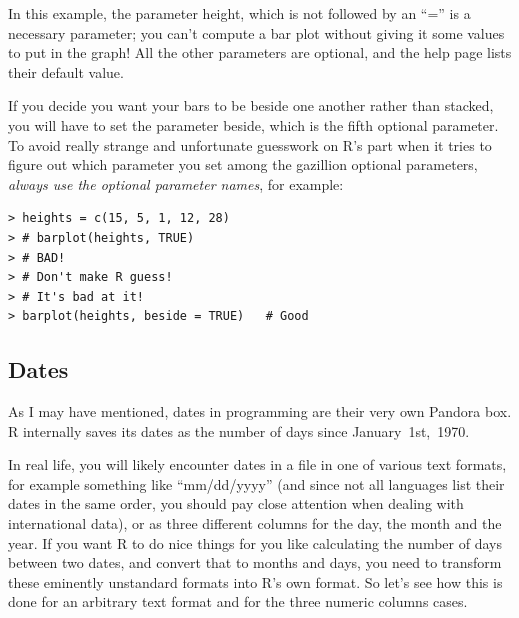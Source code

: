 \documentclass{report}
\newcommand{\code}[1]{\textsf{\ttfamily #1}}
\begin{document}
		In this example, the parameter \code{height}, which is not followed by an ``='' is a necessary parameter; you can't compute a bar plot without giving it some values to put in the graph! All the other parameters are optional, and the help page lists their default value.
	
		If you decide you want your bars to be beside one another rather than stacked, you will have to set the parameter \code{beside}, which is the fifth optional parameter. To avoid really strange and unfortunate guesswork on R's part when it tries to figure out which parameter you set among the gazillion optional parameters, \emph{always use the optional parameter names}, for example:
		\begin{verbatim}
> heights = c(15, 5, 1, 12, 28)
> # barplot(heights, TRUE) 
> # BAD! 
> # Don't make R guess! 
> # It's bad at it!
> barplot(heights, beside = TRUE)	# Good
		\end{verbatim}
		
		\subsection{Dates}
		As I may have mentioned, dates in programming are their very own Pandora box. R internally saves its dates as the number of days since January~1st,~1970.
		
		In real life, you will likely encounter dates in a file in one of various text formats, for example something like ``mm/dd/yyyy'' (and since not all languages list their dates in the same order, you should pay close attention when dealing with international data), or as three different columns for the day, the month and the year. If you want R to do nice things for you like calculating the number of days between two dates, and convert that to months and days, you need to transform these eminently unstandard formats into R's own format. So let's see how this is done for an arbitrary text format and for the three numeric columns cases.
		
\end{document}
